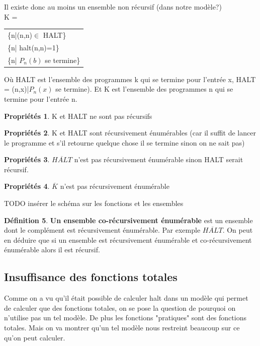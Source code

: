 \documentclass[11pt,a4paper]{article}
\renewcommand{\stcomp}[1]{\overline{#1}}
\theoremstyle{definition}
\newtheorem{mydef}{Définition}
\newtheorem{myprop}[mydef]{Propriétés}
\begin{document}
Il existe donc au moins un ensemble non récursif (dans notre 
modèle?)\\
K = 
\begin{tabular}{l}
	\{n|(n,n)$\in$ HALT\}\\
	\{n| halt(n,n)=1\}\\
	\{n| $P_n(b)$ se termine\} \\
\end{tabular}

Où HALT est l'ensemble des programmes k qui se termine pour l'entrée x, 
HALT = {(n,x)|$P_n(x)$ se termine}). Et K est l'ensemble des programmes n qui
se termine pour l'entrée n.

\begin{myprop}
	K et HALT ne sont pas récursifs
\end{myprop}
	
\begin{myprop}
	K et HALT sont récursivement énumérables (car il suffit de lancer le 
	programme et s’il retourne quelque chose il se termine sinon on ne sait 
	pas)
\end{myprop}
	
\begin{myprop}
	$\stcomp{HALT}$ n'est pas récursivement énumérable sinon HALT 
		serait récursif.
\end{myprop}
	
\begin{myprop}
	$\stcomp{K}$ n'est pas récursivement énumérable
\end{myprop}
	

TODO insérer le schéma sur les fonctions et les ensembles

\begin{mydef}
	\textbf{Un ensemble co-récursivement énumérable} est un ensemble dont le 
	complément est récursivement énumérable. Par exemple $\stcomp{HALT}$. On peut 
	en déduire que si un ensemble est récursivement énumérable et co-récursivement 
	énumérable alors il est récursif.
\end{mydef}


\subsection{Insuffisance des fonctions totales}
\label{sub:insuffisance_des_fonctions_totales}
Comme on a vu qu'il était possible de calculer halt dans un modèle qui
permet de calculer que des fonctions totales, on se pose la question de 
pourquoi on n'utilise pas un tel modèle. De plus les fonctions "pratiques" sont 
des fonctions totales. Mais on va montrer qu'un tel modèle nous restreint 
beaucoup sur ce qu'on peut calculer.
\end{document}
